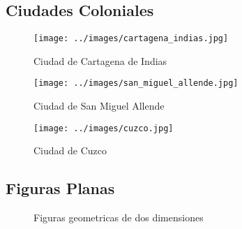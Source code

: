 \documentclass{article}
\begin{document}
	\listoffigures

	\subsection*{Ciudades Coloniales}

	\begin{figure}[!ht]
		\centering
		\texttt{[image: ../images/cartagena\_indias.jpg]}
		\caption{Ciudad de Cartagena de Indias}
	\end{figure}

	\begin{figure}[!ht]
		\centering
		\texttt{[image: ../images/san\_miguel\_allende.jpg]}
		\caption{Ciudad de San Miguel Allende}
	\end{figure}

	\begin{figure}[!ht]
		\centering
		\texttt{[image: ../images/cuzco.jpg]}
		\caption{Ciudad de Cuzco}
	\end{figure}

	\subsection*{Figuras Planas}

	\begin{figure}[!ht]
		\centering
		\caption{Figuras geometricas de dos dimensiones}
	\end{figure}
\end{document}
